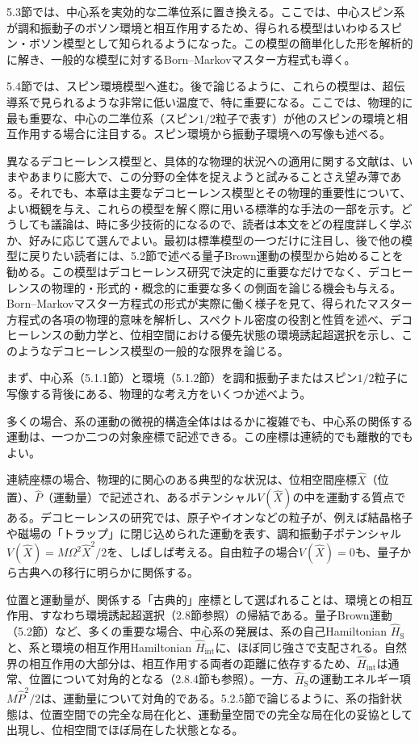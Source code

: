 5.3節では、中心系を実効的な二準位系に置き換える。ここでは、中心スピン系が調和振動子のボソン環境と相互作用するため、得られる模型はいわゆるスピン・ボソン模型として知られるようになった。この模型の簡単化した形を解析的に解き、一般的な模型に対するBorn--Markovマスター方程式も導く。

5.4節では、スピン環境模型へ進む。後で論じるように、これらの模型は、超伝導系で見られるような非常に低い温度で、特に重要になる。ここでは、物理的に最も重要な、中心の二準位系（スピン$1/2$粒子で表す）が他のスピンの環境と相互作用する場合に注目する。スピン環境から振動子環境への写像も述べる。

異なるデコヒーレンス模型と、具体的な物理的状況への適用に関する文献は、いまやあまりに膨大で、この分野の全体を捉えようと試みることさえ望み薄である。それでも、本章は主要なデコヒーレンス模型とその物理的重要性について、よい概観を与え、これらの模型を解く際に用いる標準的な手法の一部を示す。どうしても議論は、時に多少技術的になるので、読者は本文をどの程度詳しく学ぶか、好みに応じて選んでよい。最初は標準模型の一つだけに注目し、後で他の模型に戻りたい読者には、5.2節で述べる量子Brown運動の模型から始めることを勧める。この模型はデコヒーレンス研究で決定的に重要なだけでなく、デコヒーレンスの物理的・形式的・概念的に重要な多くの側面を論じる機会も与える。Born--Markovマスター方程式の形式が実際に働く様子を見て、得られたマスター方程式の各項の物理的意味を解析し、スペクトル密度の役割と性質を述べ、デコヒーレンスの動力学と、位相空間における優先状態の環境誘起超選択を示し、このようなデコヒーレンス模型の一般的な限界を論じる。

\hypertarget{srcpage:173}{}\label{srcpage:173}
まず、中心系（5.1.1節）と環境（5.1.2節）を調和振動子またはスピン$1/2$粒子に写像する背後にある、物理的な考え方をいくつか述べよう。

多くの場合、系の運動の微視的構造全体ははるかに複雑でも、中心系の関係する運動は、一つか二つの対象座標で記述できる。この座標は連続的でも離散的でもよい。

連続座標の場合、物理的に関心のある典型的な状況は、位相空間座標$\hat X$（位置）、$\hat P$（運動量）で記述され、あるポテンシャル$V(\hat X)$の中を運動する質点である。デコヒーレンスの研究では、原子やイオンなどの粒子が、例えば結晶格子や磁場の「トラップ」に閉じ込められた運動を表す、調和振動子ポテンシャル$V(\hat X)=M\Omega^2\hat X^2/2$を、しばしば考える。自由粒子の場合$V(\hat X)=0$も、量子から古典への移行に明らかに関係する。

位置と運動量が、関係する「古典的」座標として選ばれることは、環境との相互作用、すなわち環境誘起超選択（2.8節参照）の帰結である。量子Brown運動（5.2節）など、多くの重要な場合、中心系の発展は、系の自己Hamiltonian $\hat H_{\mathrm S}$と、系と環境の相互作用Hamiltonian $\hat H_{\mathrm{int}}$に、ほぼ同じ強さで支配される。自然界の相互作用の大部分は、相互作用する両者の距離に依存するため、$\hat H_{\mathrm{int}}$は通常、位置について対角的となる（2.8.4節も参照）。一方、$\hat H_{\mathrm S}$の運動エネルギー項$M\hat P^2/2$は、運動量について対角的である。5.2.5節で論じるように、系の指針状態は、位置空間での完全な局在化と、運動量空間での完全な局在化の妥協として出現し、位相空間でほぼ局在した状態となる\cite{ref086,ref106,ref109}。

